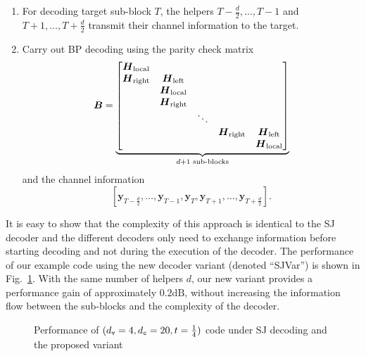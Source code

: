 \begin{enumerate}
    \item For decoding target sub-block $T$, the helpers $T-\frac d2, \dots, T-1$ and $T+1, \dots, T+\frac d2$ transmit their channel information to the target.
    \item Carry out BP decoding using the parity check matrix
    \[
    \boldsymbol{B} = \underbrace{\left[\begin{matrix}
        \boldsymbol{H}_\text{local} &         &         &         &   \\
        \boldsymbol{H}_\text{right} & \boldsymbol{H}_\text{left}  &         &         &   \\
                & \boldsymbol{H}_\text{local} &         &         &   \\
                & \boldsymbol{H}_\text{right} &         &         &   \\
                &         & \ddots  &         &   \\
                &         &         & \boldsymbol{H}_\text{right} & \boldsymbol{H}_\text{left} \\
                &         &         &         & \boldsymbol{H}_\text{local} \\
    \end{matrix}\right]}_{d+1 \text{ sub-blocks}}
    \]
    and the channel information
    \[
    [\boldsymbol{y}_{T-\frac d2}, \dots, \boldsymbol{y}_{T-1}, \boldsymbol{y}_T, \boldsymbol{y}_{T+1}, \dots, \boldsymbol{y}_{T+\frac d2}].
    \]
\end{enumerate}
It is easy to show that the complexity of this approach is identical to the SJ decoder and the different decoders only need to exchange information before starting decoding and not during the execution of the decoder. The performance of our example code using the new decoder variant (denoted ``SJVar'') is shown in Fig.~\ref{figure_comparison_sg_var1}. With the same number of helpers $d$, our new variant provides a performance gain of approximately $0.2\mathrm{dB}$, without increasing the information flow between the sub-blocks and the complexity of the decoder.

\begin{figure}[t]
     
    \caption{Performance of $(d_\mathtt{v}=4, d_\mathtt{c}=20, t=\frac14)$ code under SJ decoding and the proposed variant}
    \label{figure_comparison_sg_var1}
\end{figure}


